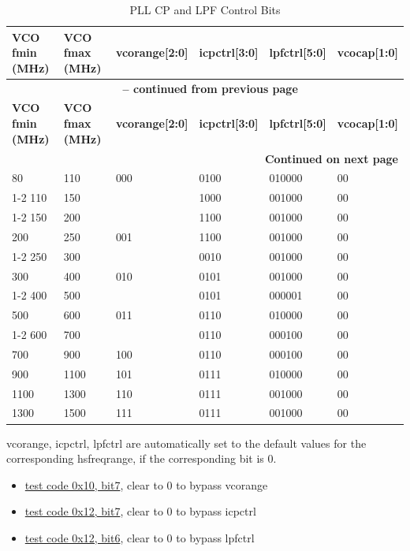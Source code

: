\documentclass[main\_\_EN.tex]{subfiles}
\begin{document}
\begin{longtable}{|p{3cm}|p{3cm}|p{3cm}|p{2cm}|p{2cm}|p{2cm}|}
    \caption{PLL CP and LPF Control Bits} \label{tab:pll-cp-and-lpf-control-bits} \\
    \hline
    \rowcolor{lightgray}
    \textbf{VCO fmin (MHz)} & \textbf{VCO fmax (MHz)} & \textbf{vcorange[2:0]} & \textbf{icpctrl[3:0]} & \textbf{lpfctrl[5:0]} & \textbf{vcocap[1:0]} \\ \hline
    \endfirsthead

    \multicolumn{6}{c}{\bfseries \tablename\ \thetable{} -- continued from previous page}\\\hline
    \rowcolor{lightgray}
    \textbf{VCO fmin (MHz)} & \textbf{VCO fmax (MHz)} & \textbf{vcorange[2:0]} & \textbf{icpctrl[3:0]} & \textbf{lpfctrl[5:0]} & \textbf{vcocap[1:0]} \\ \hline
    \endhead

    \multicolumn{6}{r}{\textbf{Continued on next page}} \\
    \endfoot

    \endlastfoot
    
    80   & 110  & 000 & 0100 & 010000 & 00 \\ \cline{1-2} \cline{4-6}
    110  & 150  &     & 1000 & 001000 & 00 \\ \cline{1-2} \cline{4-6}
    150  & 200  &     & 1100 & 001000 & 00 \\ \hline
    200  & 250  & 001 & 1100 & 001000 & 00 \\ \cline{1-2} \cline{4-6}
    250  & 300  &     & 0010 & 001000 & 00 \\ \hline
    300  & 400  & 010 & 0101 & 001000 & 00 \\ \cline{1-2} \cline{4-6}
    400  & 500  &     & 0101 & 000001 & 00 \\ \hline
    500  & 600  & 011 & 0110 & 010000 & 00 \\ \cline{1-2} \cline{4-6}
    600  & 700  &     & 0110 & 000100 & 00 \\ \hline
    700  & 900  & 100 & 0110 & 000100 & 00 \\ \hline
    900  & 1100 & 101 & 0111 & 010000 & 00 \\ \hline
    1100 & 1300 & 110 & 0111 & 001000 & 00 \\ \hline
    1300 & 1500 & 111 & 0111 & 001000 & 00 \\ \hline
\end{longtable}

\begin{tiplisting}
    vcorange, icpctrl, lpfctrl are automatically set to the default values for the corresponding hsfreqrange, if the corresponding bit is 0.
    \begin{itemize}
        \item \hyperref[sec:test-code-0x10]{test code 0x10, bit7}, clear to 0 to bypass vcorange
        \item \hyperref[sec:test-code-0x12]{test code 0x12, bit7}, clear to 0 to bypass icpctrl
        \item \hyperref[sec:test-code-0x12]{test code 0x12, bit6}, clear to 0 to bypass lpfctrl
    \end{itemize}
\end{tiplisting}
\end{document}
